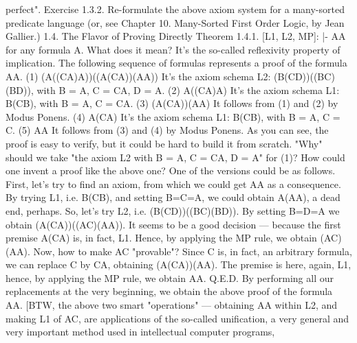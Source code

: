 perfect".
Exercise 1.3.2. Re-formulate the above axiom system for a many-sorted predicate language (or, see
Chapter 10. Many-Sorted First Order Logic, by Jean Gallier.)
1.4. The Flavor of Proving Directly
Theorem 1.4.1. [L1, L2, MP]: |- A\IMPLIES A for any formula A. What does it mean? It's the so-called
reflexivity property of implication.
The following sequence of formulas represents a proof of the formula A\IMPLIES A.
(1) (A\IMPLIES ((C\IMPLIES A)\IMPLIES A))\IMPLIES ((A\IMPLIES (C\IMPLIES A))\IMPLIES (A\IMPLIES A)) It's the axiom schema L2:
                                                   (B\IMPLIES (C\IMPLIES D))\IMPLIES ((B\IMPLIES C)\IMPLIES (B\IMPLIES D)),
                                                              with B = A, C = C\IMPLIES A, D = A.
(2) A\IMPLIES ((C\IMPLIES A)\IMPLIES A) It's the axiom schema L1:
                     B\IMPLIES (C\IMPLIES B), with B = A, C = C\IMPLIES A.
(3) (A\IMPLIES (C\IMPLIES A))\IMPLIES (A\IMPLIES A) It follows from (1) and (2) by Modus
                           Ponens.
(4) A\IMPLIES (C\IMPLIES A) It's the axiom schema L1:
               B\IMPLIES (C\IMPLIES B), with B = A, C = C.
(5) A\IMPLIES A It follows from (3) and (4) by Modus
         Ponens.
As you can see, the proof is easy to verify, but it could be hard to build it from scratch. "Why" should we
take "the axiom L2 with B = A, C = C\IMPLIES A, D = A" for (1)?
How could one invent a proof like the above one? One of the versions could be as follows. First, let's try to find an axiom,
from which we could get A\IMPLIES A as a consequence. By trying L1, i.e. B\IMPLIES (C\IMPLIES B), and setting B=C=A, we could obtain
A\IMPLIES (A\IMPLIES A), a dead end, perhaps. So, let's try L2, i.e. (B\IMPLIES (C\IMPLIES D))\IMPLIES ((B\IMPLIES C)\IMPLIES (B\IMPLIES D)). By setting B=D=A we obtain
(A\IMPLIES (C\IMPLIES A))\IMPLIES ((A\IMPLIES C)\IMPLIES (A\IMPLIES A)). It seems to be a good decision --- because the first premise A\IMPLIES (C\IMPLIES A) is, in fact, L1.
Hence, by applying the MP rule, we obtain (A\IMPLIES C)\IMPLIES (A\IMPLIES A). Now, how to make A\IMPLIES C "provable"? Since C is, in fact, an
arbitrary formula, we can replace C by C\IMPLIES A, obtaining (A\IMPLIES (C\IMPLIES A))\IMPLIES (A\IMPLIES A). The premise is here, again, L1, hence, by
applying the MP rule, we obtain A\IMPLIES A. Q.E.D. By performing all our replacements at the very beginning, we obtain the above
proof of the formula A\IMPLIES A. [BTW, the above two smart "operations" --- obtaining A\IMPLIES A within L2, and making L1 of A\IMPLIES C,
are applications of the so-called unification, a very general and very important method used in intellectual computer programs,
